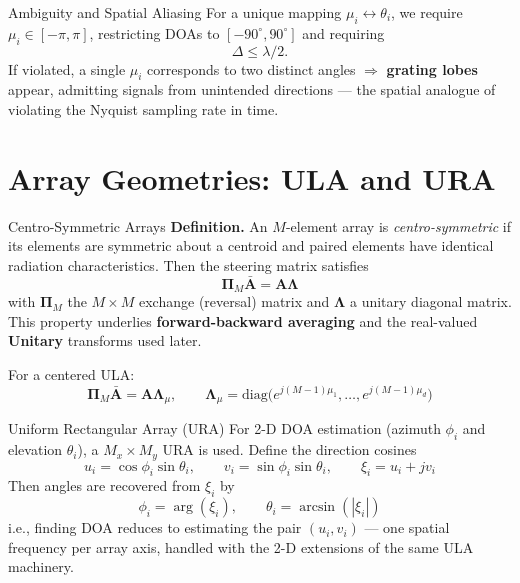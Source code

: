 \documentclass[10pt,aspectratio=169]{beamer}
\newcommand{\bA}{\bm{A}}
\newcommand{\bPi}{\bm{\Pi}}
\begin{document}
\begin{frame}{Ambiguity and Spatial Aliasing}
For a unique mapping $\mu_i \leftrightarrow \theta_i$, we require $\mu_i \in [-\pi,\pi]$, restricting DOAs to $[-90^\circ, 90^\circ]$ and requiring
\begin{equation}
	\Delta \le \lambda/2 .
\end{equation}
If violated, a single $\mu_i$ corresponds to two distinct angles $\Rightarrow$ \textbf{grating lobes} appear, admitting signals from unintended directions --- the spatial analogue of violating the Nyquist sampling rate in time.
\end{frame}

\section{Array Geometries: ULA and URA}

\begin{frame}{Centro-Symmetric Arrays}
\textbf{Definition.} An $M$-element array is \emph{centro-symmetric} if its elements are symmetric about a centroid and paired elements have identical radiation characteristics. Then the steering matrix satisfies
\begin{equation}
	\bPi_M \bar{\bA} = \bA \bm{\Lambda}
	\label{eq:3-19}
\end{equation}
with $\bPi_M$ the $M\times M$ exchange (reversal) matrix and $\bm{\Lambda}$ a unitary diagonal matrix. This property underlies \textbf{forward-backward averaging} and the real-valued \textbf{Unitary} transforms used later.

For a centered ULA:
\begin{equation}
	\bPi_M \bar{\bA} = \bA \bm{\Lambda}_\mu, \qquad
	\bm{\Lambda}_\mu = \mathrm{diag}\big(e^{j(M-1)\mu_1},\dots,e^{j(M-1)\mu_d}\big)
	\label{eq:3-22}
\end{equation}
\end{frame}

\begin{frame}{Uniform Rectangular Array (URA)}
For 2-D DOA estimation (azimuth $\phi_i$ and elevation $\theta_i$), a $M_x\times M_y$ URA is used. Define the direction cosines
\begin{equation}
	u_i = \cos\phi_i\sin\theta_i, \qquad v_i = \sin\phi_i\sin\theta_i, \qquad \xi_i = u_i + jv_i
	\label{eq:3-26}
\end{equation}
Then angles are recovered from $\xi_i$ by
\begin{equation}
	\phi_i = \arg(\xi_i), \qquad \theta_i = \arcsin(|\xi_i|)
	\label{eq:3-27}
\end{equation}
i.e., finding DOA reduces to estimating the pair $(u_i, v_i)$ --- one spatial frequency per array axis, handled with the 2-D extensions of the same ULA machinery.
\end{frame}
\end{document}
